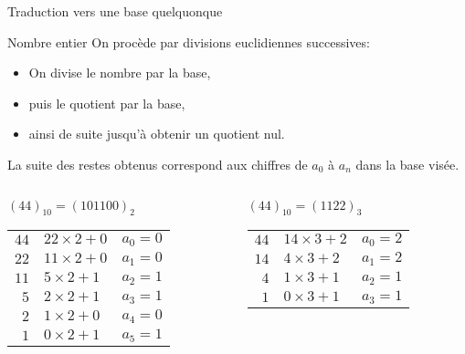 \begin{frame}{Traduction vers une base quelquonque}

  \begin{block}{Nombre entier}
    On procède par divisions euclidiennes successives:
    \begin{itemize}
    \item On divise le nombre par la base,
    \item puis le quotient par la base,
    \item ainsi de suite jusqu’à obtenir un quotient nul.
    \end{itemize}
    La suite des restes obtenus correspond aux chiffres de $a_0$ à $a_n$ dans la base visée.
  \end{block}

  
      \begin{columns}[t]
        \begin{column}{0.48\textwidth}
          \begin{exampleblock}{$(44)_{10} = (101100)_2$}
        \begin{tabular}{r@{ = }ll}
         $44$ & $22\times 2 + 0$ & $ a_0 = 0$ \\
         $22$ & $11\times 2 + 0$ & $a_1 = 0$ \\
         $11$ & $5\times 2 + 1$ & $a_2 = 1$ \\
         $5$ & $2\times 2 + 1$ & $a_3 = 1$ \\
         $2$ & $1\times 2 + 0$ & $a_4 = 0$ \\
         $1$ & $0\times 2 + 1$ & $a_5 = 1$ \\
        \end{tabular}
      \end{exampleblock}
      \end{column}


  \begin{column}{0.48\textwidth}
    \begin{exampleblock}{$(44)_{10} = (1122)_3$}
      \begin{tabular}{r@{ = }ll}
         $44$ & $14 \times 3 + 2$ & $ a_0 = 2$ \\
         $14$ & $4\times 3 + 2$ & $a_1 = 2$ \\
         $4$ & $1\times 3 + 1$ & $a_2 = 1$ \\
         $1$ & $0\times 3 + 1$ & $a_3 = 1$ \\
      \end{tabular}
    \end{exampleblock}
  \end{column}
  \end{columns}

\end{frame}



